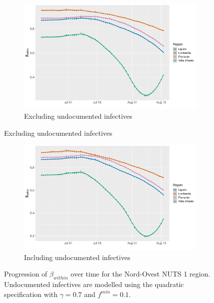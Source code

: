 \documentclass[12pt]{article}
\begin{document}
\begin{appendices}
		\begin{figure}[H]
    	    \centering
    	    \begin{subfigure}{\textwidth}
    	      \centering
    	      \includegraphics[width=0.85\linewidth]{output/model_within_lag14_betawithin_Nord-Ovest_rolling.pdf}
    	      \caption{Excluding undocumented infectives}
    	      \label{fig:beta_within_over_time_northwest_regular}
    	    \end{subfigure}
        \end{figure}
        \begin{figure}[H]\ContinuedFloat
    	    \begin{subfigure}{\textwidth}
    	      \centering
    	      \includegraphics[width=0.85\linewidth]{output/model_within_lag14_betawithin_Nord-Ovest_UndocQuadratic_rolling.pdf}
    	      \caption{Including undocumented infectives}
    	      \label{fig:beta_within_over_time_northwest_regular_undoc}
    	    \end{subfigure}
    	    \caption{Progression of $\beta_{within}$ over time for the Nord-Ovest NUTS 1 region. Undocumented infectives are modelled using the quadratic specification with $\gamma = 0.7$ and $f^{min}=0.1$.}
    	    \label{fig:beta_within_over_time_northwest}
    	\end{figure}
		

\end{appendices}
\end{document}
